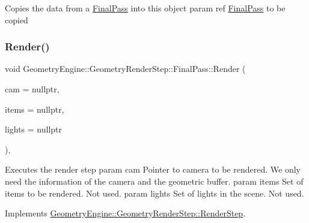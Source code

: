 Copies the data from a \mbox{\hyperlink{class_geometry_engine_1_1_geometry_render_step_1_1_final_pass}{Final\+Pass}} into this object param ref \mbox{\hyperlink{class_geometry_engine_1_1_geometry_render_step_1_1_final_pass}{Final\+Pass}} to be copied \mbox{\label{class_geometry_engine_1_1_geometry_render_step_1_1_final_pass_ad078d0e9d394754dbbd3cff871d72b9f}} 
\subsubsection{\texorpdfstring{Render()}{Render()}}
{\footnotesize\ttfamily void Geometry\+Engine\+::\+Geometry\+Render\+Step\+::\+Final\+Pass\+::\+Render (\begin{DoxyParamCaption}\item[{\mbox{\hyperlink{class_geometry_engine_1_1_geometry_world_item_1_1_geometry_camera_1_1_camera}{Geometry\+World\+Item\+::\+Geometry\+Camera\+::\+Camera}} $\ast$}]{cam = {\ttfamily nullptr},  }\item[{std\+::unordered\+\_\+set$<$ \mbox{\hyperlink{class_geometry_engine_1_1_geometry_world_item_1_1_geometry_item_1_1_geometry_item}{Geometry\+World\+Item\+::\+Geometry\+Item\+::\+Geometry\+Item}} $\ast$ $>$ $\ast$}]{items = {\ttfamily nullptr},  }\item[{std\+::unordered\+\_\+set$<$ \mbox{\hyperlink{class_geometry_engine_1_1_geometry_world_item_1_1_geometry_light_1_1_light}{Geometry\+World\+Item\+::\+Geometry\+Light\+::\+Light}} $\ast$ $>$ $\ast$}]{lights = {\ttfamily nullptr} }\end{DoxyParamCaption})\hspace{0.3cm}{\ttfamily [override]}, {\ttfamily [virtual]}}

Executes the render step param cam Pointer to camera to be rendered. We only need the information of the camera and the geometric buffer. param items Set of items to be rendered. Not used. param lights Set of lights in the scene. Not used. 

Implements \mbox{\hyperlink{class_geometry_engine_1_1_geometry_render_step_1_1_render_step_a9b054ee8f38304319a9d03ba3e173dcd}{Geometry\+Engine\+::\+Geometry\+Render\+Step\+::\+Render\+Step}}.

